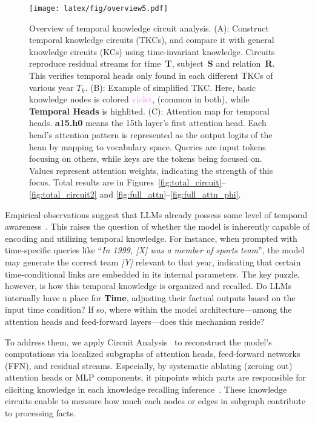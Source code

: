 \begin{figure*}[t]
\vspace{-10pt}
\begin{center}
    \texttt{[image: latex/fig/overview5.pdf]}
\end{center}%
\vspace{-10pt}%
\caption{Overview of temporal knowledge circuit analysis.
(A): Construct temporal knowledge circuits (TKCs), and compare it with general knowledge circuits (KCs) using time-invariant knowledge.
Circuits reproduce residual streams for time~\textbf{\textcolor{cyan!70!gray}{T}}, subject~\textbf{\textcolor{pink!80!gray}{S}} and relation~\textbf{\textcolor{yellow!80!gray}{R}}.
This verifies temporal heads only found in each different TKCs of various year $T_k$.
(B): Example of simplified TKC.
Here, basic knowledge nodes is colored \textcolor{violet}{violet}, (common in both), while \textbf{\textcolor{blue!60!cyan!80!black}{Temporal Heads}} is highlited.
(C): Attention map for temporal heads.
\textbf{a15.h0} means the 15th layer's first attention head.
Each head's attention pattern is represented as the output logits of the hean by mapping to vocabulary space.
Queries are input tokens focusing on others, while keys are the tokens being focused on.
Values represent attention weights, indicating the strength of this focus.
Total results are in Figures~\ref{fig:total_circuit}--\ref{fig:total_circuit2} and \ref{fig:full_attn}--\ref{fig:full_attn_phi}.
}
\label{fig:overview}
\vspace{-10pt}
\end{figure*}

Empirical observations suggest that LLMs already possess some level of temporal awareness~\citep{nylund2023time, dyknow}.
This raises the question of whether the model is inherently capable of encoding and utilizing temporal knowledge.
For instance, when prompted with time-specific queries like ``\textit{In 1999, [X] was a member of sports team}'', the model may generate the correct team \textit{[Y]} relevant to that year, indicating that certain time-conditional links are embedded in its internal parameters. 
The key puzzle, however, is how this temporal knowledge is organized and recalled.
Do LLMs internally have a place for \textbf{Time}, adjusting their factual outputs based on the input time condition?
If so, where within the model architecture—among the attention heads and feed-forward layers—does this mechanism reside?

To address them, we apply Circuit Analysis~\citep{ elhage2021mathematical, ioi} to reconstruct the model’s computations via localized subgraphs of attention heads, feed-forward networks (FFN), and residual streams.
Especially, by systematic ablating (zeroing out) attention heads or MLP components, it pinpoints which parts are responsible for eliciting knowledge in each knowledge recalling inference~\citep{KC}.
These knowledge circuits enable to measure how much each nodes or edges in subgraph contribute to processing facts.

